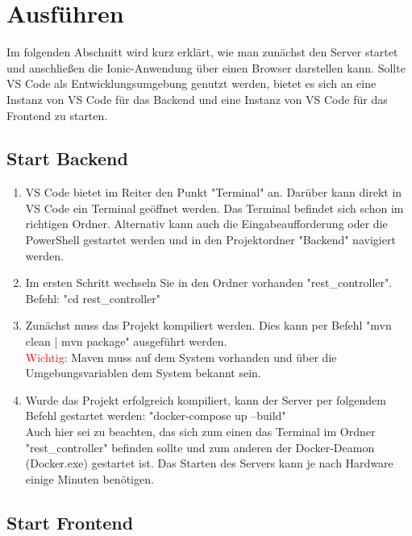 \section{Ausführen}\label{ProjektStart}
Im folgenden Abschnitt wird kurz erklärt, wie man zunächst den Server startet und anschließen die Ionic-Anwendung über einen Browser darstellen kann. Sollte VS Code als Entwicklungsumgebung genutzt werden, bietet es sich an eine Instanz von VS Code für das Backend und eine Instanz von VS Code für das Frontend zu starten.

\subsection{Start Backend}
\begin{enumerate}
    \item VS Code bietet im Reiter den Punkt "Terminal"{} an. Darüber kann direkt in VS Code ein Terminal geöffnet werden. Das Terminal befindet sich schon im richtigen Ordner. Alternativ kann auch die Eingabeaufforderung oder die PowerShell gestartet werden und in den Projektordner "Backend" navigiert werden.
    
    \item Im ersten Schritt wechseln Sie in den Ordner vorhanden "rest\_controller"{}.\\Befehl: "cd rest\_controller"{}
    
    \item Zunächst muss das Projekt kompiliert werden. Dies kann per Befehl "mvn clean | mvn package"{} ausgeführt werden.\\\textcolor{red}{Wichtig:} Maven muss auf dem System vorhanden und über die Umgebungsvariablen dem System bekannt sein.
    
    \item Wurde das Projekt erfolgreich kompiliert, kann der Server per folgendem Befehl gestartet werden: "docker-compose up --build"{}\\
    Auch hier sei zu beachten, das sich zum einen das Terminal im Ordner "rest\_controller"{} befinden sollte und zum anderen der Docker-Deamon (Docker.exe) gestartet ist. Das Starten des Servers kann je nach Hardware einige Minuten benötigen.
\end{enumerate}


\subsection{Start Frontend}

